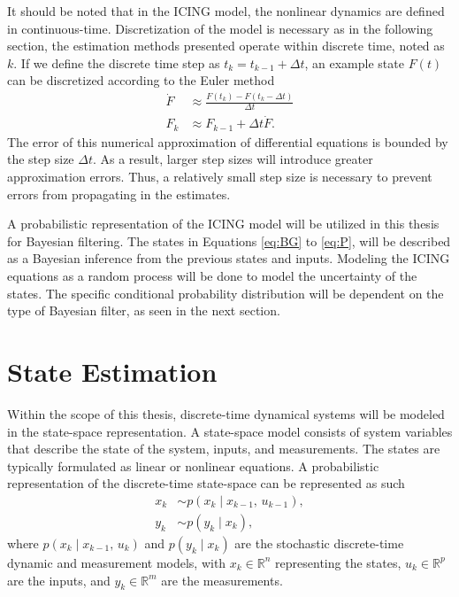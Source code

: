 \documentclass[nomenclature, english, bibtex]{kththesis}
\begin{document}
It should be noted that in the \gls{ICING} model, the nonlinear dynamics are defined in continuous-time. Discretization of the model is necessary as in the following section, the estimation methods presented operate within discrete time, noted as $k$. If we define the discrete time step as $t_{k} = t_{k-1}+ \Delta t$, an example state $F(t)$ can be discretized according to the Euler method
\begin{equation}\label{eq:euler}
\begin{aligned}
\dot{F} &\approx \frac{F(t_{k}) - F(t_{k} - \Delta t)}{\Delta t} \\
F_{k} &\approx F_{k-1} + \Delta t \dot{F}.
\end{aligned}
\end{equation}
The error of this numerical approximation of differential equations is bounded by the step size $\Delta t$. As a result, larger step sizes will introduce greater approximation errors. Thus, a relatively small step size is necessary to prevent errors from propagating in the estimates. 

A probabilistic representation of the \gls{ICING} model will be utilized in this thesis for Bayesian filtering. The states in Equations \eqref{eq:BG} to \eqref{eq:P}, will be described as a Bayesian inference from the previous states and inputs. Modeling the \gls{ICING} equations as a random process will be done to model the uncertainty of the states. The specific conditional probability distribution will be dependent on the type of Bayesian filter, as seen in the next section.

\section{State Estimation}\label{sec:state}

Within the scope of this thesis, discrete-time dynamical systems will be modeled in the state-space representation. A state-space model consists of system variables that describe the state of the system, inputs, and measurements. The states are typically formulated as linear or nonlinear equations. A probabilistic representation of the discrete-time state-space can be represented as such
\begin{equation} \label{eq:prob1}
\begin{aligned}
x_{k} &\sim p(x_{k} \mid x_{k-1},\,u_{k-1}), \\
y_{k} &\sim p(y_{k} \mid x_{k}),
\end{aligned}
\end{equation}
where $p(x_{k} \mid x_{k-1},\,u_{k})$ and $p(y_{k} \mid x_{k})$ are the stochastic discrete-time dynamic and measurement models, with $x_{k} \in\mathbb{R}^n $ representing the states, $u_{k} \in\mathbb{R}^p$ are the inputs, and $y_{k} \in\mathbb{R}^m$ are the measurements.
\end{document}

